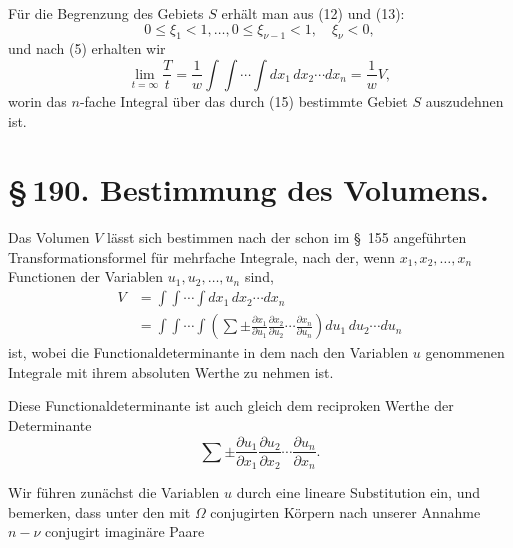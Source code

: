 \documentclass[11pt]{article}
\begin{document}
Für die Begrenzung des Gebiets $S$ erhält man aus (12) und (13):
\begin{equation}
0\leq\xi_1<1,\ldots,
0\leq\xi_{\nu-1}<1,
\quad \xi_\nu<0,
\tag{15}
\end{equation}
und nach (5) erhalten wir
\begin{equation}
\lim_{t=\infty}\frac{T}{t}
=\frac1w\int\!\int\cdots\int dx_1\,dx_2\cdots dx_n
=\frac1w V,
\tag{16}
\end{equation}
worin das $n$-fache Integral über das durch (15) bestimmte Gebiet $S$ auszudehnen ist.

\section*{\S\,190. Bestimmung des Volumens.}

Das Volumen $V$ lässt sich bestimmen nach der schon im \S~155 angeführten Transformationsformel für mehrfache Integrale, nach der, wenn $x_1,x_2,\ldots,x_n$ Functionen der Variablen $u_1,u_2,\ldots,u_n$ sind,
\begin{equation}
\begin{aligned}
V&=\int\!\int\cdots\int dx_1\,dx_2\cdots dx_n\\
&=\int\!\int\cdots\int\left(\sum\pm
\frac{\partial x_1}{\partial u_1}
\frac{\partial x_2}{\partial u_2}\cdots
\frac{\partial x_n}{\partial u_n}\right)du_1\,du_2\cdots du_n
\end{aligned}
\tag{1}
\end{equation}
ist, wobei die Functionaldeterminante in dem nach den Variablen $u$ genommenen Integrale mit ihrem absoluten Werthe zu nehmen ist.

Diese Functionaldeterminante ist auch gleich dem reciproken Werthe der Determinante
\[
\sum\pm
\frac{\partial u_1}{\partial x_1}
\frac{\partial u_2}{\partial x_2}\cdots
\frac{\partial u_n}{\partial x_n}.
\]

Wir führen zunächst die Variablen $u$ durch eine lineare Substitution ein, und bemerken, dass unter den mit $\Omega$ conjugirten Körpern nach unserer Annahme $n-\nu$ conjugirt imaginäre Paare
\end{document}
